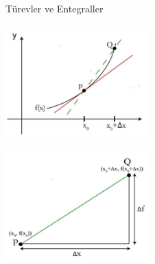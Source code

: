 \documentclass[12pt,fleqn]{article}\usepackage{../../common}
\begin{document}
Türevler ve Entegraller

\includegraphics[width=15em]{ode_mattuck_65_diffint1_01.jpg}

\includegraphics[width=15em]{ode_mattuck_65_diffint1_02.jpg}
\end{document}
